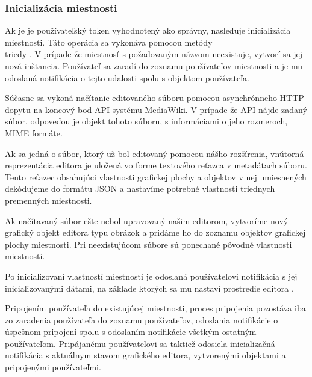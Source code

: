 \subsubsection{Inicializácia miestnosti}
Ak je je používateľský token vyhodnotený ako správny, nasleduje inicializácia miestnosti. Táto operácia sa vykonáva pomocou metódy \\ triedy . V prípade že miestnosť s požadovaným názvom neexistuje, vytvorí sa jej nová inštancia. Používateľ sa zaradí do zoznamu používateľov miestnosti a je mu odoslaná notifikácia o tejto udalosti spolu s objektom používateľa.

Súčasne sa vykoná načítanie editovaného súboru pomocou asynchrónneho HTTP dopytu na koncový bod API systému MediaWiki. V prípade že API nájde zadaný súbor, odpoveďou je objekt tohoto súboru, s informáciami o jeho rozmeroch, MIME formáte. 

Ak sa jedná o súbor, ktorý už bol editovaný pomocou nášho rozšírenia, vnútorná reprezentácia editora je uložená vo forme textového reťazca v metadátach súboru. Tento reťazec obsahujúci vlastnosti grafickej plochy a objektov v nej umiesnených dekódujeme do formátu JSON a nastavíme potrebné vlastnosti triednych premenných miestnosti. 

Ak načítavaný súbor ešte nebol upravovaný našim editorom, vytvoríme nový grafický objekt editora typu obrázok a pridáme ho do zoznamu objektov grafickej plochy miestnosti. Pri neexistujúcom súbore sú ponechané pôvodné vlastnosti miestnosti.

Po inicializovaní vlastností miestnosti je odoslaná používateľovi notifikácia s jej inicializovanými dátami, na základe ktorých sa mu nastaví prostredie editora .

Pripojením používateľa do existujúcej miestnosti, proces pripojenia pozostáva iba zo zaradenia používateľa do zoznamu používateľov, odoslania notifikácie o úspešnom pripojení spolu s odoslaním notifikácie všetkým ostatným používateľom. Pripájanému používateľovi sa taktiež odosiela inicializačná notifikácia s aktuálnym stavom grafického editora, vytvorenými objektami a pripojenými používateľmi.

